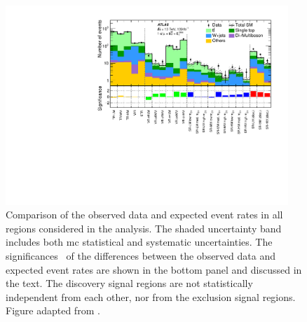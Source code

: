  \begin{figure}
	\centering\includegraphics[width=0.95\textwidth]{histpull_CRVRSR}
	\caption{Comparison of the observed data and expected event rates in all regions considered in the analysis. The shaded uncertainty band includes both \gls{mc} statistical and systematic uncertainties. The significances~\cite{Cousins:2007bmb} of the differences between the observed data and expected event rates are shown in the bottom panel and discussed in the text. The discovery signal regions are not statistically independent from each other, nor from the exclusion signal regions. Figure adapted from \cite{SUSY-2019-08}.}
	\label{fig:result_histpull}
\end{figure}


\FloatBarrier

